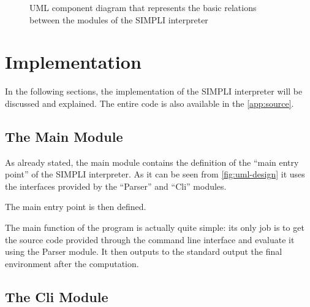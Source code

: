 \documentclass{esposito-documentation}
\begin{document}
\begin{figure}[H]
	\centering
	\caption{UML component diagram that represents the basic relations between the modules of the SIMPLI interpreter}
	\label{fig:uml-design}
\end{figure}

\chapter{Implementation}

In the following sections, the implementation of the SIMPLI interpreter will be
discussed and explained. The entire code is also available in the
\autoref{app:source}.
\section{The Main Module}



As already stated, the main module contains the definition of the ``main entry
point'' of the SIMPLI interpreter. As it can be seen from
\autoref{fig:uml-design} it uses the interfaces provided by the ``Parser'' and
``Cli'' modules.



The main entry point is then defined. 


The main function of the program is actually quite simple: its only job is to
get the source code provided through the command line interface and evaluate it
using the Parser module. It then outputs to the standard output the final
environment after the computation.

\section{The Cli Module}


\end{document}

